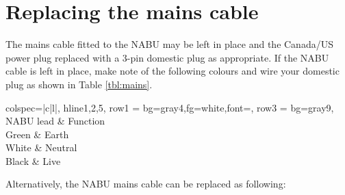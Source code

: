 \section{Replacing the mains cable}
The mains cable fitted to the NABU may be left in place and the Canada/US power plug replaced with a 3-pin domestic plug as appropriate. If the NABU cable is left in place, make note of the following colours and wire your domestic plug as shown in Table \ref{tbl:mains}.
\begin{center}
	\sffamily
	\begin{tblr}{
			colspec={|c|l|},
			hline{1,2,5},
			row{1} = {bg=gray4,fg=white,font=\bfseries},
			row{3} = {bg=gray9},
		}
		NABU lead & Function \\
		Green & Earth \\
		White & Neutral \\
		Black & Live \\
	\end{tblr}
	\label{tbl:mains}
\end{center}
Alternatively, the NABU mains cable can be replaced as following:
